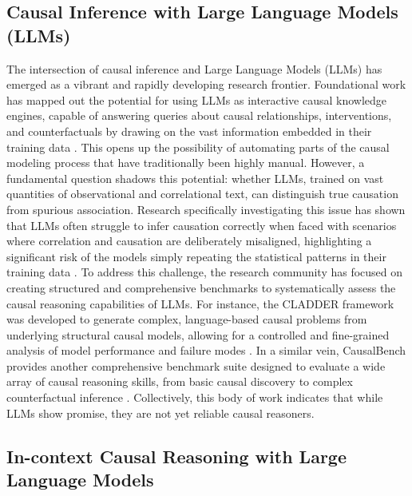 {\subsection{Causal Inference with Large Language Models (LLMs)}

The intersection of causal inference and Large Language Models (LLMs) has emerged as a vibrant and rapidly developing research frontier. Foundational work has mapped out the potential for using LLMs as interactive causal knowledge engines, capable of answering queries about causal relationships, interventions, and counterfactuals by drawing on the vast information embedded in their training data \cite{kiciman2023causal}. This opens up the possibility of automating parts of the causal modeling process that have traditionally been highly manual.
However, a fundamental question shadows this potential: whether LLMs, trained on vast quantities of observational and correlational text, can distinguish true causation from spurious association. Research specifically investigating this issue has shown that LLMs often struggle to infer causation correctly when faced with scenarios where correlation and causation are deliberately misaligned, highlighting a significant risk of the models simply repeating the statistical patterns in their training data \cite{jin2023can}.
To address this challenge, the research community has focused on creating structured and comprehensive benchmarks to systematically assess the causal reasoning capabilities of LLMs. For instance, the CLADDER framework was developed to generate complex, language-based causal problems from underlying structural causal models, allowing for a controlled and fine-grained analysis of model performance and failure modes \cite{jin2023cladder}. In a similar vein, CausalBench provides another comprehensive benchmark suite designed to evaluate a wide array of causal reasoning skills, from basic causal discovery to complex counterfactual inference \cite{wang2024causalbench}. Collectively, this body of work indicates that while LLMs show promise, they are not yet reliable causal reasoners.

\subsection{In-context Causal Reasoning with Large Language Models}

}
